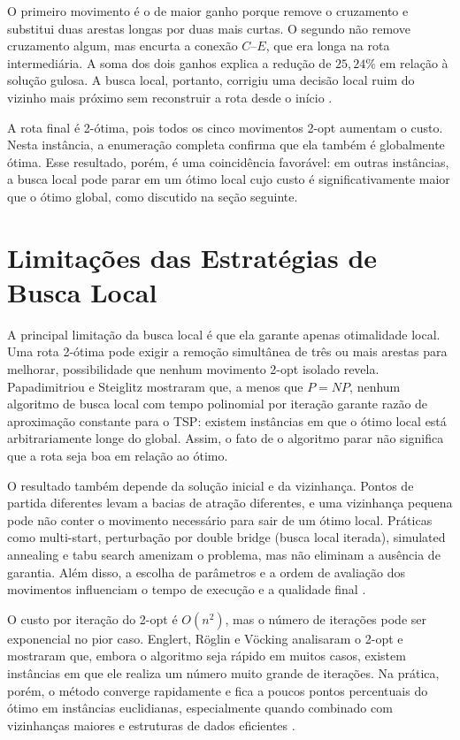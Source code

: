 O primeiro movimento é o de maior ganho porque remove o cruzamento e substitui duas arestas longas por duas mais curtas. O segundo não remove cruzamento algum, mas encurta a conexão $C$--$E$, que era longa na rota intermediária. A soma dos dois ganhos explica a redução de $25{,}24\%$ em relação à solução gulosa. A busca local, portanto, corrigiu uma decisão local ruim do vizinho mais próximo sem reconstruir a rota desde o início \cite{johnson1997}.

A rota final é 2-ótima, pois todos os cinco movimentos 2-opt aumentam o custo. Nesta instância, a enumeração completa confirma que ela também é globalmente ótima. Esse resultado, porém, é uma coincidência favorável: em outras instâncias, a busca local pode parar em um ótimo local cujo custo é significativamente maior que o ótimo global, como discutido na seção seguinte.

\section{Limitações das Estratégias de Busca Local}

A principal limitação da busca local é que ela garante apenas otimalidade local. Uma rota 2-ótima pode exigir a remoção simultânea de três ou mais arestas para melhorar, possibilidade que nenhum movimento 2-opt isolado revela. Papadimitriou e Steiglitz \cite{papadimitriou1977} mostraram que, a menos que $P = NP$, nenhum algoritmo de busca local com tempo polinomial por iteração garante razão de aproximação constante para o TSP: existem instâncias em que o ótimo local está arbitrariamente longe do global. Assim, o fato de o algoritmo parar não significa que a rota seja boa em relação ao ótimo.

O resultado também depende da solução inicial e da vizinhança. Pontos de partida diferentes levam a bacias de atração diferentes, e uma vizinhança pequena pode não conter o movimento necessário para sair de um ótimo local. Práticas como multi-start, perturbação por double bridge (busca local iterada), simulated annealing e tabu search amenizam o problema, mas não eliminam a ausência de garantia. Além disso, a escolha de parâmetros e a ordem de avaliação dos movimentos influenciam o tempo de execução e a qualidade final \cite{souza_ufop, goldbarg2005, aarts2003}.

O custo por iteração do 2-opt é $O(n^2)$, mas o número de iterações pode ser exponencial no pior caso. Englert, Röglin e Vöcking \cite{englert2014} analisaram o 2-opt e mostraram que, embora o algoritmo seja rápido em muitos casos, existem instâncias em que ele realiza um número muito grande de iterações. Na prática, porém, o método converge rapidamente e fica a poucos pontos percentuais do ótimo em instâncias euclidianas, especialmente quando combinado com vizinhanças maiores e estruturas de dados eficientes \cite{johnson1997, helsgaun2000}.

